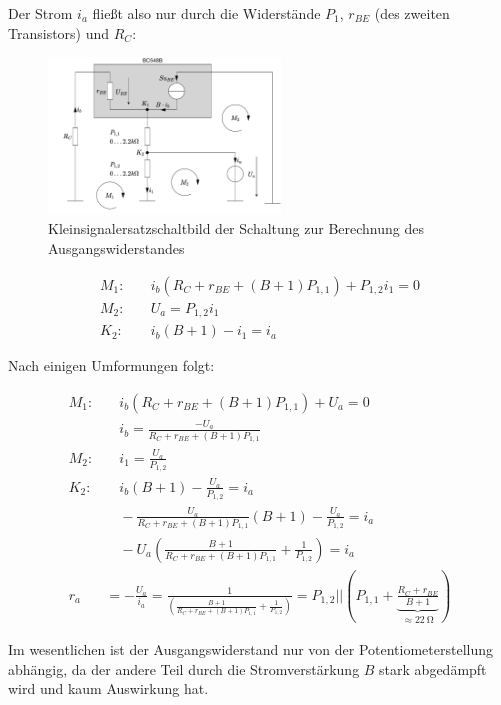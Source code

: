 Der Strom $i_a$ fließt also nur durch die Widerstände $P_1$, $r_{BE}$ (des zweiten Transistors) und $R_C$:

\begin{figure}[H]
    \centering
    \includegraphics[width = 0.55\textwidth]{tex/1_Microphone/pictures/KSESB_ra_detail.pdf}
    \caption{Kleinsignalersatzschaltbild der Schaltung zur Berechnung des Ausgangswiderstandes}
    \label{fig:my_label}
\end{figure}


\begin{align*}
    M_1:& \quad i_b(R_C + r_{BE} + (B+1) P_{1,1}) + P_{1,2} i_1= 0 \\
    M_2:& \quad U_a = P_{1,2} i_1 \\
    K_2:& \quad i_b (B+1) - i_1 = i_a
\end{align*}

Nach einigen Umformungen folgt:

\begin{align*}
    M_1:& \quad i_b(R_C + r_{BE} + (B+1) P_{1,1}) + U_a= 0 \\
    & \quad i_b = \frac{-U_a}{R_C + r_{BE} + (B+1) P_{1,1}}\\
    M_2:& \quad i_1 = \frac{U_a }{ P_{1,2}} \\
    K_2:& \quad i_b (B+1) - \frac{U_a }{ P_{1,2}} = i_a \\
        & \quad - \frac{U_a}{R_C + r_{BE} + (B+1) P_{1,1}}(B+1) - \frac{U_a }{ P_{1,2}} = i_a \\
        & \quad - U_a \left( \frac{B+1}{R_C + r_{BE} + (B+1) P_{1,1}} + \frac{1}{P_{1,2}} \right) = i_a \\
        r_a &= -\frac{U_a}{i_a} = \frac{1}{\left( \frac{B+1}{R_C + r_{BE} + (B+1) P_{1,1}} + \frac{1}{P_{1,2}} \right)} = P_{1,2} || \left( P_{1,1} + \underbrace{\frac{R_C + r_{BE}}{B+1}}_{\approx \SI{22}{\ohm}}\right)
\end{align*}

Im wesentlichen ist der Ausgangswiderstand nur von der Potentiometerstellung abhängig, da der andere Teil durch die Stromverstärkung $B$ stark abgedämpft wird und kaum Auswirkung hat.

